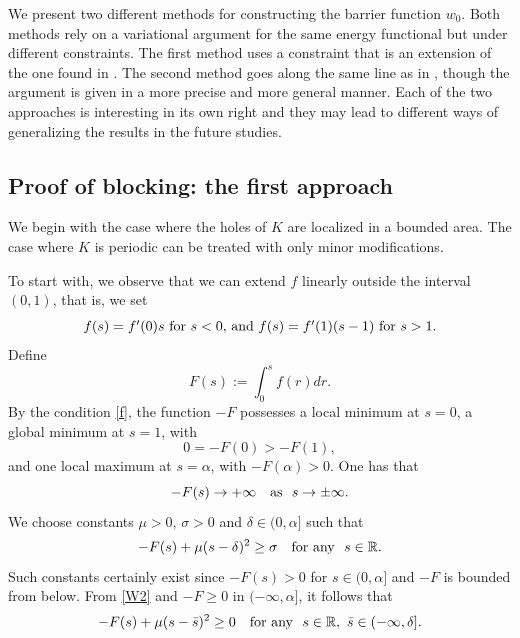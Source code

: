 \documentclass[a4paper,12pt,fullpage]{article}
\numberwithin{equation}{section}
\newcommand{\be}{\begin{equation}}
\newcommand{\ee}{\end{equation}}
\def\R{{\mathbb R}}
\begin{document}
We present two different methods for constructing the barrier function $w_0$. Both methods rely on a variational argument for the same energy functional but under different constraints. The first method uses a constraint that is an extension of the one found in \cite[Theorem~6.2]{M}. The second method goes along the same line as in \cite{BBC}, though the argument is given in a more precise and more general manner.  Each of the two approaches is interesting in its own right and they may lead to different ways of generalizing the results in the future studies. 


\subsection{Proof of blocking: the first approach}\label{ss:blocking1}

We begin with the case where the holes of $K$ are localized in a bounded area. The case where $K$ is periodic can be treated with only minor modifications.

To start with, we observe that we can extend $f$ linearly outside the interval $(0,1)$, that is, we set
\be\label{fextended}
\hbox{$f(s)= f'(0) s$ for $s<0$, and $f(s) = f'(1) (s-1)$ for $s > 1$.}
\ee
Define
\[
F(s):=\int_0^s f(r)dr.
\]
By the condition \eqref{f}, the function $-F$ possesses a local minimum at $s=0$, a global minimum at $s=1$, with
\[
0=-F(0)>-F(1),
\]
and one local maximum at $s=\alpha$, with $-F(\alpha)>0$. One has that
\[
-F(s)\to+\infty \quad\hbox{as}\ \ s\to\pm\infty.
\]
We choose constants $\mu>0$, $\sigma>0$ and $\delta\in(0,\alpha]$ such that
\begin{equation}\label{W2}
-F(s)+\mu (s-\delta)^2\geq \sigma  \quad \hbox{for any}\ \ s\in\R.
\end{equation}
Such constants certainly exist since $-F(s)> 0$ for $s\in(0,\alpha]$ and $-F$ is bounded from below. From \eqref{W2} and $-F\ge0$ in $(-\infty,\alpha]$, it follows that
\begin{equation}\label{W1}
-F(s)+\mu (s-\bar s)^2\geq 0 \quad \hbox{for any}\ \ s\in\R, \ \bar s\in(-\infty,\delta].
\end{equation}
\end{document}
